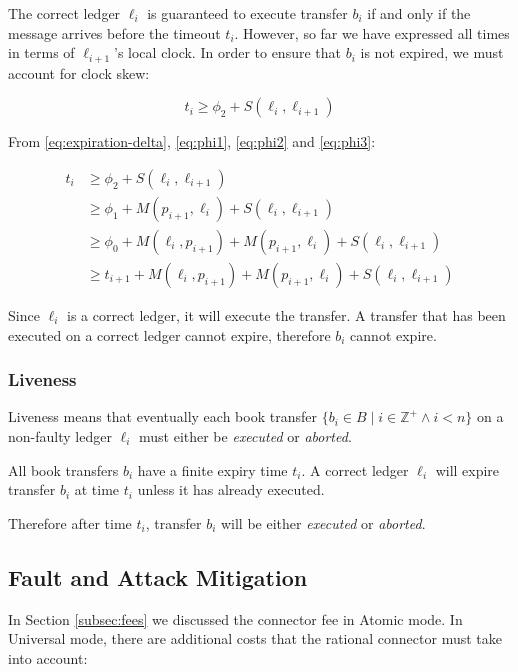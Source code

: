 \documentclass[letterpaper,twocolumn,10pt]{article}
\begin{document}
The correct ledger $\ell_i$ is guaranteed to execute transfer $b_i$ if and only if the message arrives before the timeout $t_i$. However, so far we have expressed all times in terms of $\ell_{i+1}$'s local clock. In order to ensure that $b_i$ is not expired, we must account for clock skew:

\begin{equation}
\label{eq:phi3}
t_i \geq \phi_2 + S(\ell_i, \ell_{i+1})
\end{equation}

From \ref{eq:expiration-delta}, \ref{eq:phi1}, \ref{eq:phi2} and \ref{eq:phi3}:

\begin{equation}
\begin{split}
t_i & \geq \phi_2 + S(\ell_i, \ell_{i+1}) \\
    & \geq \phi_1 + M(p_{i+1}, \ell_i) + S(\ell_i, \ell_{i+1}) \\
    & \geq \phi_0 + M(\ell_i, p_{i+1}) + M(p_{i+1}, \ell_i) + S(\ell_i, \ell_{i+1}) \\
    & \geq t_{i+1} + M(\ell_i, p_{i+1}) + M(p_{i+1}, \ell_i) + S(\ell_i, \ell_{i+1})
\end{split}
\end{equation}

Since $\ell_i$ is a correct ledger, it will execute the transfer. A transfer that has been executed on a correct ledger cannot expire, therefore $b_i$ cannot expire.

\subsubsection{Liveness}

Liveness means that eventually each book transfer $ \{ b_i \in B \mid i \in \mathbb{Z}^+ \land i < n \} $ on a non-faulty ledger $\ell_i$ must either be \textit{executed} or \textit{aborted}.

All book transfers $b_i$ have a finite expiry time $t_i$. A correct ledger $\ell_i$ will expire transfer $b_i$ at time $t_i$ unless it has already executed.

Therefore after time $t_i$, transfer $b_i$ will be either \textit{executed} or \textit{aborted}.

\subsection{Fault and Attack Mitigation}

In Section \ref{subsec:fees} we discussed the connector fee in Atomic mode. In Universal mode, there are additional costs that the rational connector must take into account:
\end{document}
